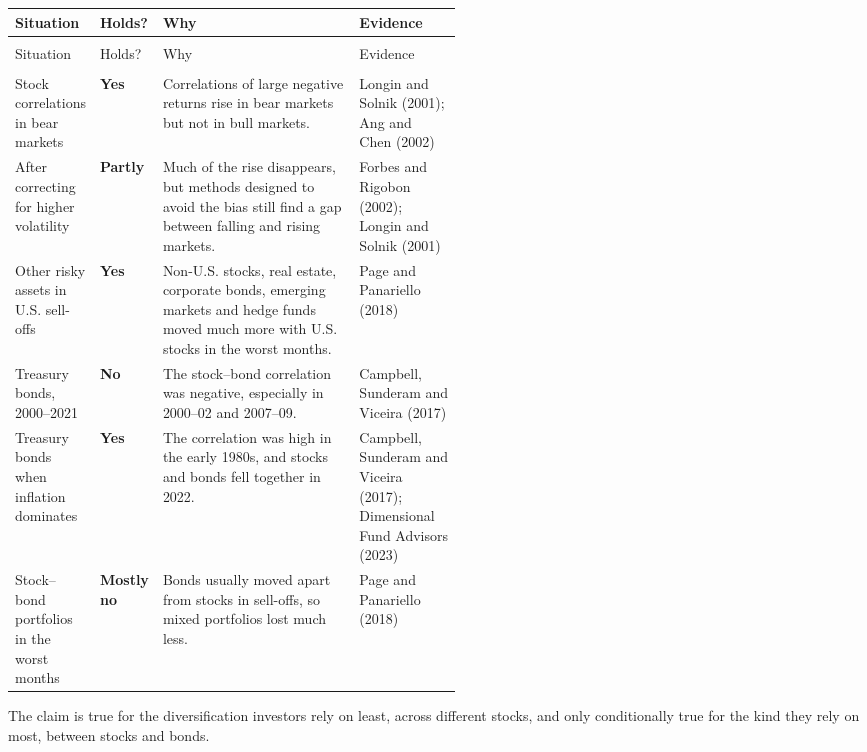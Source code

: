{\small
\begin{longtable}{@{}>{\raggedright\arraybackslash}p{0.19\linewidth}>{\raggedright\arraybackslash}p{0.10\linewidth}>{\raggedright\arraybackslash}p{}>{\raggedright\arraybackslash}p{0.23\linewidth}@{}}
\toprule
Situation & Holds? & Why & Evidence \\
\midrule
\endfirsthead
\multicolumn{4}{@{}l}{\emph{(continued)}} \\
\toprule
Situation & Holds? & Why & Evidence \\
\midrule
\endhead
\midrule
\multicolumn{4}{r@{}}{\emph{(continued on the next page)}} \\
\endfoot
\bottomrule
\endlastfoot
Stock correlations in bear markets & \textbf{Yes} & Correlations of large negative returns rise in bear markets but not in bull markets. & Longin and Solnik (2001); Ang and Chen (2002) \\
\addlinespace[3pt]
After correcting for higher volatility & \textbf{Partly} & Much of the rise disappears, but methods designed to avoid the bias still find a gap between falling and rising markets. & Forbes and Rigobon (2002); Longin and Solnik (2001) \\
\addlinespace[3pt]
Other risky assets in U.S. sell-offs & \textbf{Yes} & Non-U.S. stocks, real estate, corporate bonds, emerging markets and hedge funds moved much more with U.S. stocks in the worst months. & Page and Panariello (2018) \\
\addlinespace[3pt]
Treasury bonds, 2000--2021 & \textbf{No} & The stock--bond correlation was negative, especially in 2000--02 and 2007--09. & Campbell, Sunderam and Viceira (2017) \\
\addlinespace[3pt]
Treasury bonds when inflation dominates & \textbf{Yes} & The correlation was high in the early 1980s, and stocks and bonds fell together in 2022. & Campbell, Sunderam and Viceira (2017); Dimensional Fund Advisors (2023) \\
\addlinespace[3pt]
Stock--bond portfolios in the worst months & \textbf{Mostly no} & Bonds usually moved apart from stocks in sell-offs, so mixed portfolios lost much less. & Page and Panariello (2018) \\
\end{longtable}
}

The claim is true for the diversification investors rely on least, across different stocks, and only conditionally true for the kind they rely on most, between stocks and bonds.

